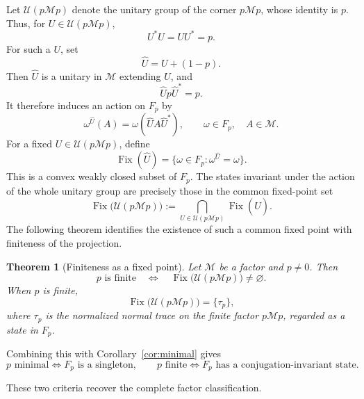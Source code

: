 \documentclass[11pt]{article}
\newtheorem{theorem}{Theorem}[section]
\begin{document}
Let $\mathcal U(p\mathcal Mp)$ denote the unitary group of the corner
$p\mathcal Mp$, whose identity is $p$. Thus, for
$U\in\mathcal U(p\mathcal Mp)$,
\[
U^*U=UU^*=p.
\]
For such a $U$, set
\[
\widehat U=U+(1-p).
\]
Then $\widehat U$ is a unitary in $\mathcal M$ extending $U$, and
\[
\widehat U p\widehat U^*=p.
\]
It therefore induces an action on $F_p$ by
\[
\omega^{\widehat U}(A)
=
\omega(\widehat U A\widehat U^*),
\qquad
\omega\in F_p,\quad A\in\mathcal M.
\]
For a fixed $U\in\mathcal U(p\mathcal Mp)$, define
\[
\operatorname{Fix}(\widehat U)
=
\{\omega\in F_p:\omega^{\widehat U}=\omega\}.
\]
This is a convex weakly closed subset of $F_p$. The states invariant
under the action of the whole unitary group are precisely those in the
common fixed-point set
\[
\operatorname{Fix}\bigl(\mathcal U(p\mathcal Mp)\bigr)
:=
\bigcap_{U\in\mathcal U(p\mathcal Mp)}
\operatorname{Fix}(\widehat U).
\]
The following theorem identifies the existence of such a common fixed
point with finiteness of the projection.

\begin{theorem}[Finiteness as a fixed point]
\label{thm:fixedpoint}
Let $\mathcal M$ be a factor and $p\neq0$. Then
\[
p\text{ is finite}
\quad\Longleftrightarrow\quad
\operatorname{Fix}\bigl(\mathcal U(p\mathcal Mp)\bigr)\neq\varnothing.
\]
When $p$ is finite,
\[
\operatorname{Fix}\bigl(\mathcal U(p\mathcal Mp)\bigr)
=
\{\tau_p\},
\]
where $\tau_p$ is the normalized normal trace on the finite factor
$p\mathcal Mp$, regarded as a state in $F_p$.
\end{theorem}

Combining this with Corollary~\ref{cor:minimal} gives
\[
p\text{ minimal}
\iff
F_p\text{ is a singleton},
\qquad
p\text{ finite}
\iff
F_p\text{ has a conjugation-invariant state}.
\]

These two criteria recover the complete factor classification. 
\end{document}
